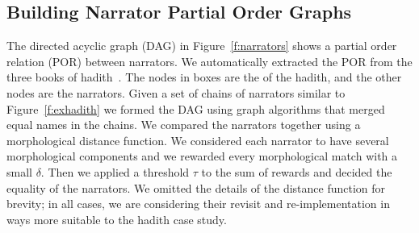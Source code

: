 \documentclass[a4,12pt]{report}
\begin{document}

\subsection{Building Narrator Partial Order Graphs}
\label{sec:POR}

\begin{figure}[tb]
\end{figure}

The directed acyclic graph (DAG) 
in Figure~\ref{f:narrators} shows a partial order relation (POR) 
between narrators.
We automatically extracted the POR from the three books of 
hadith~\cite{IbnHanbal,AlKulayni,AlTousi}.
The nodes in boxes are the  of the hadith, 
and the other nodes are the narrators.
Given a set of chains of narrators similar to 
Figure~\ref{f:exhadith} we formed the DAG using graph algorithms 
that merged equal names in the chains. 
We compared the narrators together using a morphological
distance function. 
We considered each narrator to have several morphological 
components and we rewarded every morphological match with 
a small $\delta$. 
Then we applied a threshold $\tau$ to the sum of rewards
and decided the equality of the narrators. 
We omitted the details of the distance function for brevity; 
%
in all cases, we are considering their revisit and re-implementation
in ways more suitable to the hadith case study.
\end{document}
